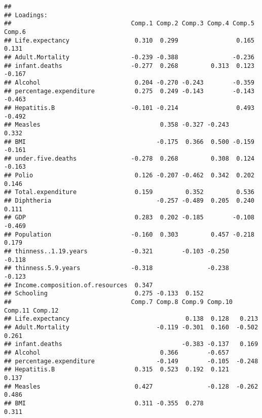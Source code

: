 \documentclass[
]{article}
\newenvironment{Shaded}{\begin{snugshade}}{\end{snugshade}}
\newcommand{\DocumentationTok}[1]{\textcolor[rgb]{0.56,0.35,0.01}{\textbf{\textit{#1}}}}
\newcommand{\NormalTok}[1]{#1}
\newcommand{\SpecialCharTok}[1]{\textcolor[rgb]{0.81,0.36,0.00}{\textbf{#1}}}
\begin{document}
\begin{Shaded}
\end{Shaded}

\begin{verbatim}
## 
## Loadings:
##                                 Comp.1 Comp.2 Comp.3 Comp.4 Comp.5 Comp.6
## Life.expectancy                  0.310  0.299                0.165  0.131
## Adult.Mortality                 -0.239 -0.388               -0.236       
## infant.deaths                   -0.277  0.268         0.313  0.123 -0.167
## Alcohol                          0.204 -0.270 -0.243        -0.359       
## percentage.expenditure           0.275  0.249 -0.143        -0.143 -0.463
## Hepatitis.B                     -0.101 -0.214                0.493 -0.492
## Measles                                 0.358 -0.327 -0.243         0.332
## BMI                                    -0.175  0.366  0.500 -0.159 -0.161
## under.five.deaths               -0.278  0.268         0.308  0.124 -0.163
## Polio                            0.126 -0.207 -0.462  0.342  0.202  0.146
## Total.expenditure                0.159         0.352         0.536       
## Diphtheria                             -0.257 -0.489  0.205  0.240  0.111
## GDP                              0.283  0.202 -0.185        -0.108 -0.469
## Population                      -0.160  0.303         0.457 -0.218  0.179
## thinness..1.19.years            -0.321        -0.103 -0.250        -0.118
## thinness.5.9.years              -0.318               -0.238        -0.123
## Income.composition.of.resources  0.347                                   
## Schooling                        0.275 -0.133  0.152                     
##                                 Comp.7 Comp.8 Comp.9 Comp.10 Comp.11 Comp.12
## Life.expectancy                                0.138  0.128   0.213         
## Adult.Mortality                        -0.119 -0.301  0.160  -0.502   0.261 
## infant.deaths                                 -0.383 -0.137   0.169         
## Alcohol                                 0.366        -0.657                 
## percentage.expenditure                 -0.149        -0.105  -0.248         
## Hepatitis.B                      0.315  0.523  0.192  0.121           0.137 
## Measles                          0.427               -0.128  -0.262   0.486 
## BMI                              0.311 -0.355  0.278                  0.311 

\end{verbatim}
\end{document}
